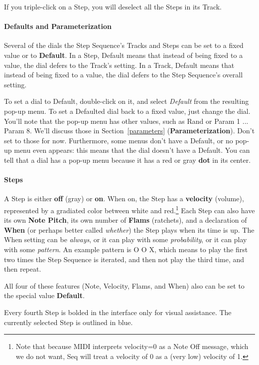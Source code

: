 \documentclass[twoside,10pt]{article}
\begin{document}
If you triple-click on a Step, you will deselect all the Steps in its Track.

\paragraph{Defaults and Parameterization}

Several of the dials the Step Sequence's Tracks and Steps can be set to a fixed value or to {\bf Default}.  In a Step, Default means that instead of being fixed to a value, the dial defers to the Track's setting.  In a Track, Default means that instead of being fixed to a value, the dial defers to the Step Sequence's overall setting.

To set a dial to Default, double-click on it, and select {\it Default} from the resulting pop-up menu.  To set a Defaulted dial back to a fixed value, just change the dial.  You'll note that the pop-up menu has other values, such as Rand or Param 1 ... Param 8.  We'll discuss those in Section~\ref{parameters} ({\bf Parameterization}).  Don't set to those for now.  Furthermore, some menus don't have a Default, or no pop-up menu even appears: this means that the dial doesn't have a Default.  You can tell that a dial has a pop-up menu because it has a red or gray {\bf dot} in its center. 

\paragraph{Steps}

A Step is either {\bf off} (gray) or {\bf on}.  When on, the Step has a {\bf velocity} (volume), represented by a gradiated color between white and red.\footnote{Note that because MIDI interprets velocity=0 as a Note Off message, which we do not want, Seq will treat a velocity of 0 as a (very low) velocity of 1.} Each Step can also have its own {\bf Note Pitch}, its own number of {\bf Flams} (ratchets), and a declaration of {\bf When} (or perhaps better called {\it whether}) the Step plays when its time is up.  The When setting can be {\it always}, or it can play with some {\it probability}, or it can play with some {\it pattern}.  An example pattern is \textsf{O O X}, which means to play the first two times the Step Sequence is iterated, and then not play the third time, and then repeat. 

All four of these features (Note, Velocity, Flams, and When) also can be set to the special value {\bf Default}.   

Every fourth Step is bolded in the interface only for visual assistance.    The currently selected Step is outlined in blue.
\end{document}
